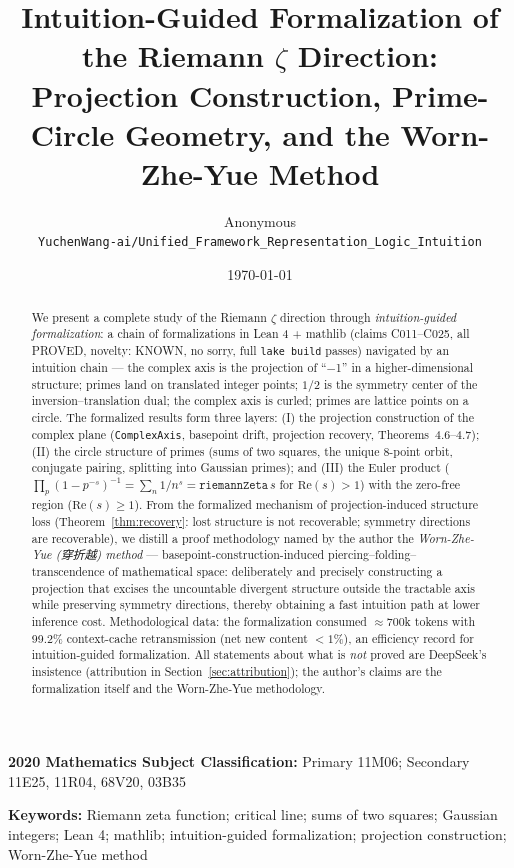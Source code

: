 \documentclass[11pt]{article}
\title{Intuition-Guided Formalization of the Riemann $\zeta$ Direction:
       Projection Construction, Prime-Circle Geometry, and the
       Worn-Zhe-Yue Method}
\author{Anonymous\\[2pt]
        \small \texttt{YuchenWang-ai/Unified\_Framework\_Representation\_Logic\_Intuition}}
\date{\today}
\theoremstyle{remark}
\providecommand{\subjclass}[2][]{\par\medskip\noindent\textbf{2020
Mathematics Subject Classification:} #2\par}
\providecommand{\keywords}[1]{\par\medskip\noindent\textbf{Keywords:} #1\par}
\begin{document}
\maketitle

\begin{abstract}
We present a complete study of the Riemann $\zeta$ direction through
\emph{intuition-guided formalization}: a chain of formalizations in Lean 4 +
mathlib (claims C011--C025, all PROVED, novelty: KNOWN, no sorry, full
\texttt{lake build} passes) navigated by an intuition chain --- the complex
axis is the projection of ``$-$1'' in a higher-dimensional structure; primes
land on translated integer points; $1/2$ is the symmetry center of the
inversion--translation dual; the complex axis is curled; primes are lattice
points on a circle. The formalized results form three layers: (I) the
projection construction of the complex plane (\texttt{ComplexAxis}, basepoint
drift, projection recovery, Theorems~4.6--4.7); (II) the circle structure of
primes (sums of two squares, the unique 8-point orbit, conjugate pairing,
splitting into Gaussian primes); and (III) the Euler product
($\prod_p (1-p^{-s})^{-1} = \sum_n 1/n^s = \texttt{riemannZeta}\,s$ for
$\mathrm{Re}(s)>1$) with the zero-free region ($\mathrm{Re}(s)\geq 1$). From
the formalized mechanism of projection-induced structure loss
(Theorem~\ref{thm:recovery}: lost structure is not recoverable; symmetry
directions are recoverable), we distill a proof methodology named by the
author the \emph{Worn-Zhe-Yue (穿折越) method} --- basepoint-construction-induced
piercing--folding--transcendence of mathematical space: deliberately and
precisely constructing a projection that excises the uncountable divergent
structure outside the tractable axis while preserving symmetry directions,
thereby obtaining a fast intuition path at lower inference cost.
Methodological data: the formalization consumed $\approx$700k tokens with
99.2\% context-cache retransmission (net new content $<1\%$), an efficiency
record for intuition-guided formalization. All statements about what is
\emph{not} proved are DeepSeek's insistence (attribution in
Section~\ref{sec:attribution}); the author's claims are the formalization
itself and the Worn-Zhe-Yue methodology.
\end{abstract}

\subjclass[2020]{Primary 11M06; Secondary 11E25, 11R04, 68V20, 03B35}

\keywords{Riemann zeta function; critical line; sums of two squares;
Gaussian integers; Lean 4; mathlib; intuition-guided formalization;
projection construction; Worn-Zhe-Yue method}
\end{document}
